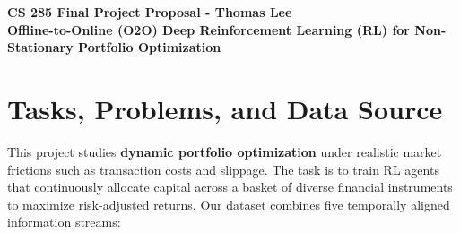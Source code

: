 \documentclass[10pt]{article}
\begin{document}
\begin{center}
    \textbf{\large CS 285 Final Project Proposal - Thomas Lee} \\
    \textbf{Offline-to-Online (O2O) Deep Reinforcement Learning (RL) for Non-Stationary Portfolio Optimization}
\end{center}



\section{Tasks, Problems, and Data Source}

This project studies \textbf{dynamic portfolio optimization} under realistic market frictions such as transaction costs and slippage. The task is to train RL agents that continuously allocate capital across a basket of diverse financial instruments to maximize risk-adjusted returns. Our dataset combines five temporally aligned information streams:


\end{document}

